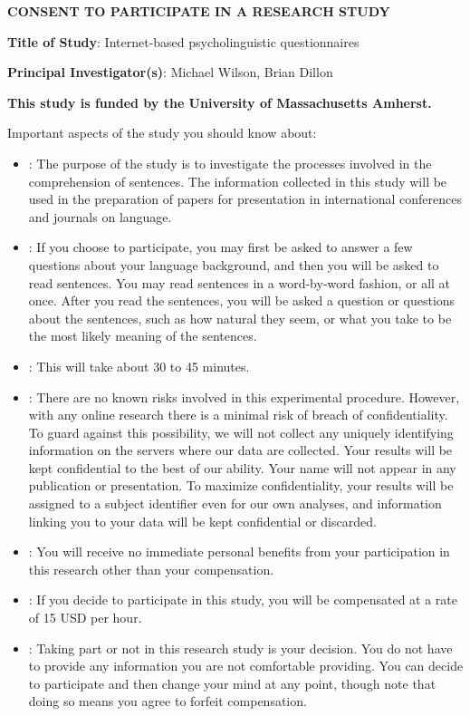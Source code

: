 \documentclass[11pt,letterpaper,onecolumn,onepage]{wilson}
\title{}
\author{}
\date{}
\begin{document}
	\begin{center}
		\textbf{CONSENT TO PARTICIPATE IN A RESEARCH STUDY}
	\end{center}
	
	\textbf{Title of Study}: Internet-based psycholinguistic questionnaires
	
	\textbf{Principal Investigator(s)}: Michael Wilson, Brian Dillon
	
	\textbf{This study is funded by the University of Massachusetts Amherst.}
	
	Important aspects of the study you should know about:
	\begin{itemize}
		\item \textbf{}: The purpose of the study is to investigate the processes involved in the comprehension of sentences. The information collected in this study will be used in the preparation of papers for presentation in international conferences and journals on language.
    	\item \textbf{}: If you choose to participate, you may first be asked to answer a few questions about your language background, and then you will be asked to read sentences. You may read sentences in a word-by-word fashion, or all at once. After you read the sentences, you will be asked a question or questions about the sentences, such as how natural they seem, or what you take to be the most likely meaning of the sentences.
    	\item \textbf{}: This will take about 30 to 45 minutes.
    	\item \textbf{}: There are no known risks involved in this experimental procedure. However, with any online research there is a minimal risk of breach of confidentiality. To guard against this possibility, we will not collect any uniquely identifying information on the servers where our data are collected. Your results will be kept confidential to the best of our ability. Your name will not appear in any publication or presentation. To maximize confidentiality, your results will be assigned to a subject identifier even for our own analyses, and information linking you to your data will be kept confidential or discarded.
    	\item \textbf{}: You will receive no immediate personal benefits from your participation in this research other than your compensation.
    	\item \textbf{}: If you decide to participate in this study, you will be compensated at a rate of 15 USD per hour.
    	\item \textbf{}: Taking part or not in this research study is your decision. You do not have to provide any information you are not comfortable providing. You can decide to participate and then change your mind at any point, though note that doing so means you agree to forfeit compensation.
	\end{itemize}
	
\end{document}
